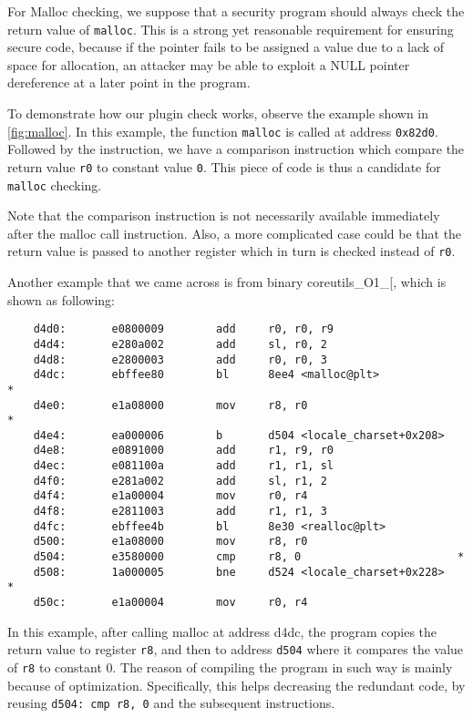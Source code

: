 For Malloc checking, we suppose that a security program should always check the
return value of \texttt{malloc}. This is a strong yet reasonable requirement
for ensuring secure code, because if the pointer fails to be assigned a value
due to a lack of space for allocation, an attacker may be able to
exploit a NULL pointer dereference at a later point in the program.

To demonstrate how our plugin check works, observe the example shown in
\ref{fig:malloc}. In this example, the function \texttt{malloc} is called at
address \texttt{0x82d0}. Followed by the instruction, we have a comparison
instruction which compare the return value \texttt{r0} to constant value
\texttt{0}. This piece of code is thus a candidate for \texttt{malloc}
checking.

Note that the comparison instruction is not necessarily available immediately after
the malloc call instruction. Also, a more complicated case could be that the
return value is passed to another register which in turn is checked
instead of \texttt{r0}.

Another example that we came across is from binary coreutils\_O1\_[, which is
shown as following:

\begin{center}
\lstset{language=C,
caption=Malloc disassembly, breaklines=true, basicstyle=\tiny, numbers=none}
\begin{lstlisting}
    d4d0:       e0800009        add     r0, r0, r9
    d4d4:       e280a002        add     sl, r0, 2
    d4d8:       e2800003        add     r0, r0, 3
    d4dc:       ebffee80        bl      8ee4 <malloc@plt>             *
    d4e0:       e1a08000        mov     r8, r0                        *
    d4e4:       ea000006        b       d504 <locale_charset+0x208>
    d4e8:       e0891000        add     r1, r9, r0
    d4ec:       e081100a        add     r1, r1, sl
    d4f0:       e281a002        add     sl, r1, 2
    d4f4:       e1a00004        mov     r0, r4
    d4f8:       e2811003        add     r1, r1, 3
    d4fc:       ebffee4b        bl      8e30 <realloc@plt>
    d500:       e1a08000        mov     r8, r0
    d504:       e3580000        cmp     r8, 0                        *
    d508:       1a000005        bne     d524 <locale_charset+0x228>   *
    d50c:       e1a00004        mov     r0, r4
\end{lstlisting}
\end{center}
In this example, after calling malloc at address d4dc, the program copies the
return value to register \texttt{r8}, and then to address \texttt{d504} where
it compares the value of \texttt{r8} to constant 0. The reason of compiling the
program in such way is mainly because of optimization. Specifically, this
helps decreasing the redundant code, by reusing \texttt{d504: cmp r8, 0} and
the subsequent instructions.

